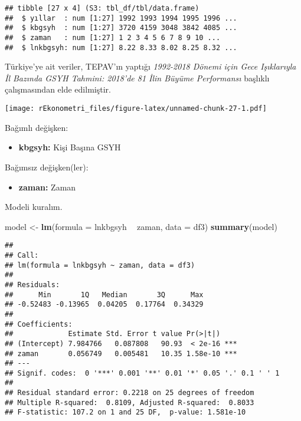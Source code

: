 \documentclass[
]{book}
\newenvironment{Shaded}{\begin{snugshade}}{\end{snugshade}}
\newcommand{\DataTypeTok}[1]{\textcolor[rgb]{0.13,0.29,0.53}{#1}}
\newcommand{\KeywordTok}[1]{\textcolor[rgb]{0.13,0.29,0.53}{\textbf{#1}}}
\newcommand{\NormalTok}[1]{#1}
\newcommand{\OperatorTok}[1]{\textcolor[rgb]{0.81,0.36,0.00}{\textbf{#1}}}
\newcommand{\StringTok}[1]{\textcolor[rgb]{0.31,0.60,0.02}{#1}}
\providecommand{\tightlist}{%
  \setlength{\itemsep}{0pt}\setlength{\parskip}{0pt}}
\begin{document}
\begin{verbatim}
## tibble [27 x 4] (S3: tbl_df/tbl/data.frame)
##  $ yıllar  : num [1:27] 1992 1993 1994 1995 1996 ...
##  $ kbgsyh  : num [1:27] 3720 4159 3048 3842 4085 ...
##  $ zaman   : num [1:27] 1 2 3 4 5 6 7 8 9 10 ...
##  $ lnkbgsyh: num [1:27] 8.22 8.33 8.02 8.25 8.32 ...
\end{verbatim}

Türkiye'ye ait veriler, TEPAV'ın yaptığı \emph{1992-2018 Dönemi için Gece Işıklarıyla İl Bazında GSYH Tahmini: 2018'de 81 İlin Büyüme Performansı} başlıklı çalışmasından elde edilmiştir.

\begin{Shaded}
\end{Shaded}

\texttt{[image: rEkonometri\_files/figure-latex/unnamed-chunk-27-1.pdf]}

Bağımlı değişken:

\begin{itemize}
\tightlist
\item
  \textbf{kbgsyh:} Kişi Başına GSYH
\end{itemize}

Bağımsız değişken(ler):

\begin{itemize}
\tightlist
\item
  \textbf{zaman:} Zaman
\end{itemize}

Modeli kuralım.

\begin{Shaded}
\begin{Highlighting}[]
\NormalTok{model <-}\StringTok{ }\KeywordTok{lm}\NormalTok{(}\DataTypeTok{formula =}\NormalTok{ lnkbgsyh }\OperatorTok{~}\StringTok{ }\NormalTok{zaman, }\DataTypeTok{data =}\NormalTok{ df3)}
\KeywordTok{summary}\NormalTok{(model)}
\end{Highlighting}
\end{Shaded}

\begin{verbatim}
## 
## Call:
## lm(formula = lnkbgsyh ~ zaman, data = df3)
## 
## Residuals:
##      Min       1Q   Median       3Q      Max 
## -0.52483 -0.13965  0.04205  0.17764  0.34329 
## 
## Coefficients:
##             Estimate Std. Error t value Pr(>|t|)    
## (Intercept) 7.984766   0.087808   90.93  < 2e-16 ***
## zaman       0.056749   0.005481   10.35 1.58e-10 ***
## ---
## Signif. codes:  0 '***' 0.001 '**' 0.01 '*' 0.05 '.' 0.1 ' ' 1
## 
## Residual standard error: 0.2218 on 25 degrees of freedom
## Multiple R-squared:  0.8109, Adjusted R-squared:  0.8033 
## F-statistic: 107.2 on 1 and 25 DF,  p-value: 1.581e-10
\end{verbatim}
\end{document}
